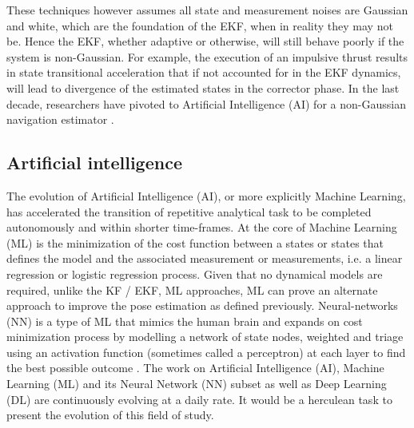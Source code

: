 These techniques however assumes all state and measurement noises are Gaussian and white, which are the foundation of the EKF, when in reality they may not be. Hence the EKF, whether adaptive or otherwise, will still behave poorly if the system is non-Gaussian. For example, the execution of an impulsive thrust results in state transitional acceleration that if not accounted for in the EKF dynamics, will lead to divergence of the estimated states in the corrector phase. In the last decade, researchers have pivoted to Artificial Intelligence (AI) for a non-Gaussian navigation estimator \cite{}.       

\subsection{Artificial intelligence}\label{CHAP1_3_2}
The evolution of Artificial Intelligence (AI), or more explicitly Machine Learning, has accelerated the transition of repetitive analytical task to be completed autonomously and within shorter time-frames. At the core of Machine Learning (ML) is the minimization of the cost function between a states or states that defines the model and the associated measurement or measurements, i.e. a linear regression or logistic regression process. Given that no dynamical models are required, unlike the KF / EKF, ML approaches, ML can prove an alternate approach to improve the pose estimation as defined previously. Neural-networks (NN) is a type of ML that mimics the human brain and expands on cost minimization process by modelling a network of state nodes, weighted and triage using an activation function (sometimes called a perceptron) at each layer to find the best possible outcome \cite{yangML21}.
The work on Artificial Intelligence (AI), Machine Learning (ML) and its Neural Network (NN) subset as well as Deep Learning (DL) are continuously evolving at a daily rate. It would be a herculean task to present the evolution of this field of study. 


